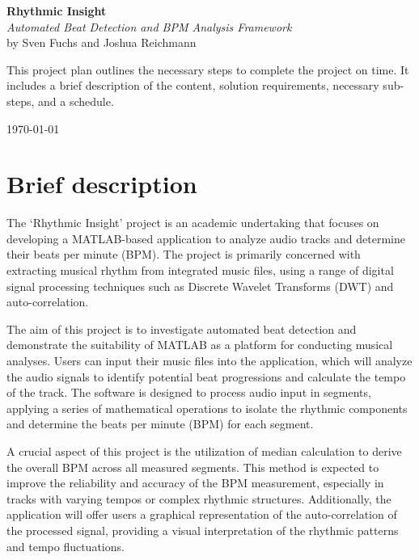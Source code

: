 \documentclass[a4paper,12pt,oneside]{article}
\author{}
\date{}
\begin{document}
\begin{titlepage}
  \centering
  \vspace*{1cm}
  
  {\Large\textbf{Rhythmic Insight}}\\[0.5cm]
  {\large\textit{Automated Beat Detection and BPM Analysis Framework}}\\[2cm]
  
  {\large by Sven Fuchs and Joshua Reichmann}\\[1cm]
  
  \vfill
  \begin{minipage}{0.8\textwidth}
  This project plan outlines the necessary steps to complete the project
  on time. It includes a brief description of the content, solution
  requirements, necessary sub-steps, and a schedule.
  \end{minipage}
  
  \vfill
  
  {\large \today}
\end{titlepage}

\newpage
\pagestyle{fancy}
\fancyhf{}
\fancyhead[R]{\textsl{\leftmark}}
\fancyfoot[C]{\thepage}
\setcounter{page}{1}

\section{Brief description}

The `Rhythmic Insight' project is an academic undertaking that focuses
on developing a MATLAB-based application to analyze audio tracks and
determine their beats per minute (BPM). The project is primarily
concerned with extracting musical rhythm from integrated music files,
using a range of digital signal processing techniques such as Discrete
Wavelet Transforms (DWT) and auto-correlation.

The aim of this project is to investigate automated beat detection and
demonstrate the suitability of MATLAB as a platform for conducting
musical analyses. Users can input their music files into the
application, which will analyze the audio signals to identify potential
beat progressions and calculate the tempo of the track. The software is
designed to process audio input in segments, applying a series of
mathematical operations to isolate the rhythmic components and determine
the beats per minute (BPM) for each segment.

A crucial aspect of this project is the utilization of median
calculation to derive the overall BPM across all measured segments. This
method is expected to improve the reliability and accuracy of the BPM
measurement, especially in tracks with varying tempos or complex
rhythmic structures. Additionally, the application will offer users a
graphical representation of the auto-correlation of the processed
signal, providing a visual interpretation of the rhythmic patterns and
tempo fluctuations.
\end{document}
